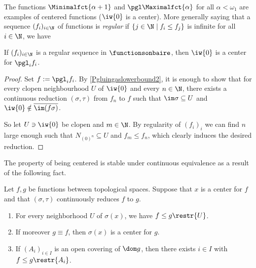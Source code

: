 The functions $\Minimalfct{\alpha+1}$ and $\pgl\Maximalfct{\alpha}$ for all $\alpha<\omega_1$ are examples of centered functions ($\iw{0}$ is a center). More generally
saying that a sequence $(f_i)_{i\in \N}$ of functions is \emph{regular} if $\{j\in \N \mid f_i \leq f_j\}$ is infinite%
for all $i\in \N$, we have

\begin{fact}\label{Pgluingofregulariscentered}
If $(f_i)_{i\in\N}$ is a regular sequence in $\functionsonbaire$, then $\iw{0}$ is a center for $\pgl_i f_i$.
\end{fact}

\begin{proof}
Set $f:=\pgl_if_i$.
By \cref{Pgluingaslowerbound2}, it is enough to show that for every clopen neighbourhood $U$ of $\iw{0}$ and every $n\in \N$,
there exists a continuous reduction $(\sigma,\tau)$ from $f_n$ to $f$ such that $\im \sigma\subseteq U$ and $\iw{0}\notin\overline{\im(f\sigma)}$.

So let $U\ni \iw{0}$ be clopen and $m\in \N$. By regularity of $(f_i)_i$ we can find $n$ large enough such that $N_{(0)^n}\subseteq U$ and $f_m\leq f_n$, which clearly induces the desired reduction.
\end{proof}


The property of being centered is stable under continuous equivalence as a result of the following fact.

\begin{fact}\label{Centerinvariance}
Let $f,g$ be functions between topological spaces.
Suppose that $x$ is a center for $f$ and that $(\sigma,\tau)$ continuously reduces $f$ to $g$.
\begin{enumerate}
\item For every neighborhood $U$ of $\sigma(x)$, we have $f\leq g\restr{U}$.\label{Centerinvariance1}
\item If moreover $g\equiv f$, then $\sigma(x)$ is a center for $g$.\label{Centerinvariance2}
\item If $(A_i)_{i\in I}$ is an open covering of $\dom g$, then there exists $i\in I$ with $f\leq g\restr{A_i}$. \label{Centerinvariance3}
\end{enumerate}
\end{fact}

